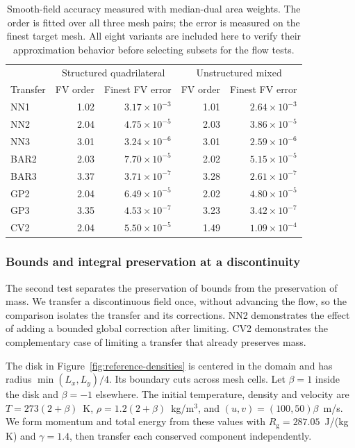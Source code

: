 \documentclass[a4paper,fleqn]{cas-sc}
\begin{document}
\begin{table}[pos=htbp]
\centering\small
\caption{Smooth-field accuracy measured with median-dual area weights. The order is fitted over all three mesh pairs; the error is measured on the finest target mesh. All eight variants are included here to verify their approximation behavior before selecting subsets for the flow tests.}
\label{tab:observed-orders}
\begin{tabular}{@{}lrrrr@{}}
\toprule
 & \multicolumn{2}{c}{Structured quadrilateral} & \multicolumn{2}{c}{Unstructured mixed}\\
Transfer & FV order & Finest FV error & FV order & Finest FV error\\
\midrule
NN1 & 1.02 & $3.17\times10^{-3}$ & 1.01 & $2.64\times10^{-3}$\\
NN2 & 2.04 & $4.75\times10^{-5}$ & 2.03 & $3.86\times10^{-5}$\\
NN3 & 3.01 & $3.24\times10^{-6}$ & 3.01 & $2.59\times10^{-6}$\\
BAR2 & 2.03 & $7.70\times10^{-5}$ & 2.02 & $5.15\times10^{-5}$\\
BAR3 & 3.37 & $3.71\times10^{-7}$ & 3.28 & $2.61\times10^{-7}$\\
GP2 & 2.04 & $6.49\times10^{-5}$ & 2.02 & $4.80\times10^{-5}$\\
GP3 & 3.35 & $4.53\times10^{-7}$ & 3.23 & $3.42\times10^{-7}$\\
CV2 & 2.04 & $5.50\times10^{-5}$ & 1.49 & $1.09\times10^{-4}$\\
\bottomrule
\end{tabular}
\end{table}

\FloatBarrier
\subsubsection{Bounds and integral preservation at a discontinuity}

The second test separates the preservation of bounds from the preservation of mass. We transfer a discontinuous field once, without advancing the flow, so the comparison isolates the transfer and its corrections. NN2 demonstrates the effect of adding a bounded global correction after limiting. CV2 demonstrates the complementary case of limiting a transfer that already preserves mass.

The disk in Figure~\ref{fig:reference-densities} is centered in the domain and has radius $\min(L_x,L_y)/4$. Its boundary cuts across mesh cells. Let $\beta=1$ inside the disk and $\beta=-1$ elsewhere. The initial temperature, density and velocity are $T=273(2+\beta)$~K, $\rho=1.2(2+\beta)$~kg/m$^3$, and $(u,v)=(100,50)\beta$~m/s. We form momentum and total energy from these values with $R_{\mathrm g}=287.05$~J/(kg\,K) and $\gamma=1.4$, then transfer each conserved component independently.
\end{document}
